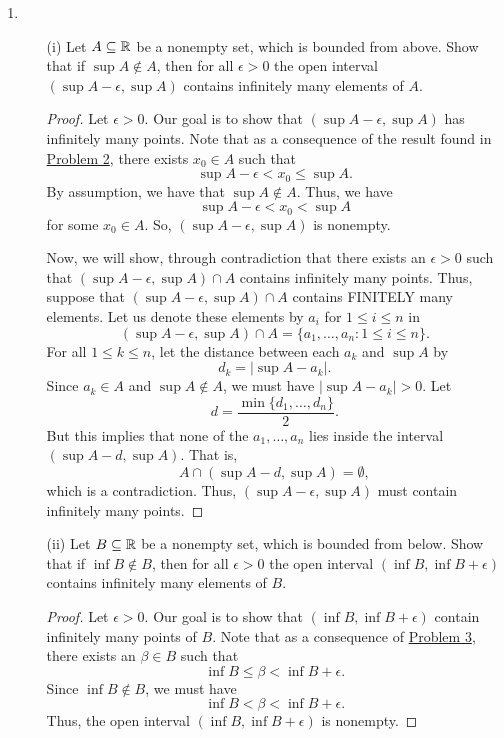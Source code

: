 \documentclass[11pt,a4paper]{article}
\begin{document}
\begin{enumerate}
\begin{proof}
\end{proof}
\item \begin{enumerate} \label{Problem 7}
    \item[(i)] Let \( A \subseteq \mathbb{R}   \) be a nonempty set, which is bounded from above. Show that if \( \sup A \notin A  \), then for all \( \epsilon > 0  \) the open interval \( (\sup A - \epsilon, \sup A ) \) contains infinitely many elements of \( A  \).
        \begin{proof}
            Let \( \epsilon > 0  \). Our goal is to show that \( (\sup A - \epsilon, \sup A ) \) has infinitely many points. Note that as a consequence of the result found in {\hyperref[Problem 2]{Problem 2}}, there exists \( {x}_{0} \in A  \) such that  
            \[  \sup A - \epsilon < {x}_{0} \leq \sup A. \]
            By assumption, we have that \( \sup A \notin A  \). Thus, we have
            \[  \sup A - \epsilon  < {x}_{0} < \sup A  \]
            for some \( {x}_{0} \in A  \). So, \( (\sup A - \epsilon, \sup A ) \) is nonempty.

            Now, we will show, through contradiction that there exists an \( \epsilon > 0  \) such that \( (\sup A - \epsilon, \sup A ) \cap A  \) contains infinitely many points. Thus, suppose that \( (\sup A - \epsilon , \sup A ) \cap A  \) contains FINITELY many elements. Let us denote these elements by \( {a}_{i} \) for  \( 1 \leq i \leq n  \) in 
        \[  (\sup A - \epsilon, \sup A ) \cap A = \{ {a}_{1}, \dots, {a}_{n}:  1 \leq i \leq n   \}. \]
        For all \( 1 \leq k \leq n  \), let the distance between each \( {a}_{k } \) and \( \sup A  \) by  
            \[  {d}_{k } = | \sup A - {a}_{k} |.  \]
            Since \( {a}_{k } \in A  \) and \( \sup A \notin A  \), we must have \(  | \sup A - {a}_{k } | > 0  \). Let 
            \[  d = \frac{ \min \{ {d}_{1}, \dots, {d}_{n} \}   }{ 2  }.   \]
            But this implies that none of the \( {a}_{1}, \dots, {a}_{n} \) lies inside the interval \( (\sup A - d , \sup A ) \). That is, 
            \[  A \cap (\sup A - d , \sup A ) = \emptyset, \]
            which is a contradiction. Thus, \( (\sup A - \epsilon , \sup A ) \) must contain infinitely many points.


        \end{proof}
    \item[(ii)] Let \( B \subseteq \mathbb{R}  \) be a nonempty set, which is bounded from below. Show that if \( \inf B \notin B  \), then for all \( \epsilon > 0  \) the open interval \( (\inf B , \inf B + \epsilon ) \) contains infinitely many elements of \( B  \).
    \begin{proof}
    Let \( \epsilon > 0  \). Our goal is to show that \( (\inf B, \inf B + \epsilon ) \) contain infinitely many points of \( B  \). Note that as a consequence of {\hyperref[Problem 3]{Problem 3}}, there exists an \( \beta \in B  \) such that  
    \[ \inf B   \leq  \beta < \inf B + \epsilon. \]
    Since \( \inf B \notin B  \), we must have
    \[  \inf B < \beta < \inf B + \epsilon. \]
    Thus, the open interval \( (\inf B, \inf B + \epsilon )  \) is nonempty.


\end{proof}
\end{enumerate}
\end{enumerate}
\end{document}
